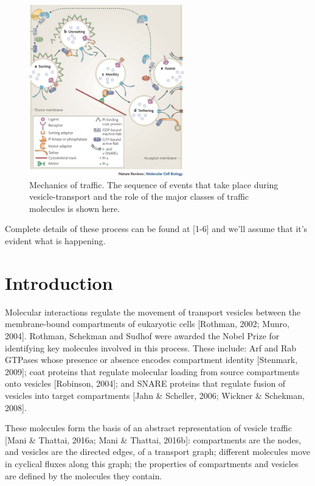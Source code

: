 \documentclass[preprint,12pt]{elsarticle}
\begin{document}
\begin{figure}[!ht]
  \caption{Mechanics of traffic. The sequence of events that take place during vesicle-transport and the role of the major classes of traffic molecules is shown here.}
  \centering
   \includegraphics[width=0.60\textwidth]{2.jpg}
\end{figure}

Complete details of these process can be found at [1-6] and we'll assume that it's evident what is happening. 
 
\section{Introduction} Molecular interactions regulate the movement of transport vesicles between the membrane-bound compartments of eukaryotic cells [Rothman, 2002; Munro, 2004]. Rothman, Schekman and Sudhof were awarded the Nobel Prize for identifying key molecules involved in this process. These include: Arf and Rab GTPases whose presence or absence encodes compartment identity [Stenmark, 2009]; coat proteins that regulate molecular loading from source compartments onto vesicles [Robinson, 2004]; and SNARE proteins that regulate fusion of vesicles into target compartments [Jahn \& Scheller, 2006; Wickner \& Schekman, 2008].

These molecules form the basis of an abstract representation of vesicle traffic [Mani \& Thattai, 2016a; Mani \& Thattai, 2016b]: compartments are the nodes, and vesicles are the directed edges, of a transport graph; different molecules move in cyclical fluxes along this graph; the properties of compartments and vesicles are defined by the molecules they contain. 
\end{document}
